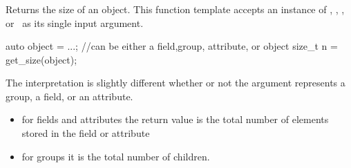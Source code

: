 \subsubsection{}

Returns the size of an object. This function template accepts an instance of 
\nxobject, \nxattribute, \nxfield, or \nxgroup\ as its single input argument.
\begin{cppcode}
auto object = ...; //can be either a field,group, attribute, or object
size_t n = get_size(object);
\end{cppcode}
The interpretation is slightly different whether or not the argument 
represents a group, a field, or an attribute. 
\begin{itemize}
\item for fields and attributes the return value is the total number of 
elements stored in the field or attribute 
\item for groups it is the total number of children.
\end{itemize}
